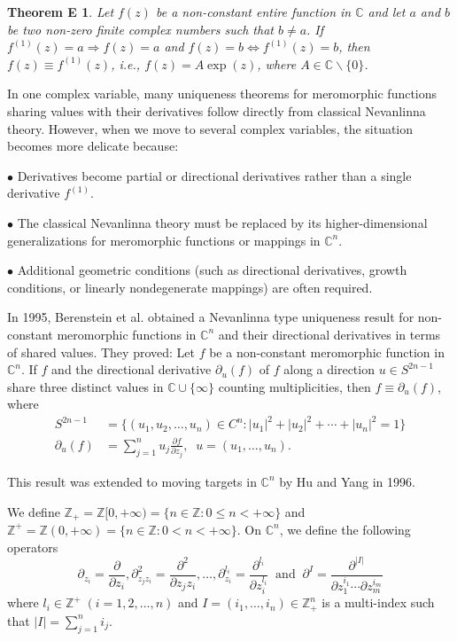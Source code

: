 \documentclass[11pt, reqno]{amsart}
\newtheorem*{theoE}{Theorem E}
\newtheorem*{cor A}{Corollary A}
\newtheorem*{cor B}{Corollary B}
\numberwithin{equation}{section}
\begin{document}
\begin{theoE}\cite[Theorem 1.1]{Lu-Xu-Yi-2009} Let $f(z)$ be a non-constant entire function in $\mathbb{C}$ and let $a$ and $b$ be two non-zero finite complex numbers such that $b\not=a$. If $f^{(1)}(z)=a\Rightarrow f(z)=a$  and $f(z)=b\Leftrightarrow f^{(1)}(z)=b$, then $f(z)\equiv f^{(1)}(z)$, i.e., $f(z)=A\exp(z)$, where $A\in\mathbb{C}\backslash \{0\}$.
\end{theoE}

In one complex variable, many uniqueness theorems for meromorphic functions sharing values with their derivatives follow directly from classical Nevanlinna theory. However, when we move to several complex variables, the situation becomes more delicate because:

$\bullet$ Derivatives become partial or directional derivatives rather than a single derivative $f^{(1)}$.

$\bullet$ The classical Nevanlinna theory must be replaced by its higher-dimensional generalizations for meromorphic functions or mappings in $\mathbb{C}^n$.

$\bullet$ Additional geometric conditions (such as directional derivatives, growth conditions, or linearly nondegenerate mappings) are often required.


\medskip
In 1995, Berenstein et al. \cite{Berenstein-Chang-Li-1995} obtained a Nevanlinna type uniqueness result for non-constant meromorphic functions in $\mathbb{C}^n$ and their directional derivatives in terms of shared values. They proved: Let $f$ be a non-constant meromorphic function in $\mathbb{C}^n$. If $f$ and the directional derivative $\partial_u(f)$ of $f$ along a direction $u\in S^{2n-1}$ share three distinct values in $\mathbb{C}\cup\{\infty\}$ counting multiplicities, then $f\equiv \partial_u(f)$, where 
\begin{align*}
 S^{2n-1}&=\{(u_1,u_2,\ldots,u_n)\in C^{n}: |u_1|^2+|u_2|^2+\cdots+|u_n|^2=1\}\\
\partial_u(f)&= \sum_{j=1}^{n} u_{j}\frac{\partial f}{\partial z_j},\;\; u=(u_1, \ldots ,u_n).
\end{align*}

This result was extended to moving targets in $\mathbb{C}^n$ by Hu and Yang \cite{Hu-Yang-1996} in 1996.

We define $\mathbb{Z}_+=\mathbb{Z}[0,+\infty)=\{n\in \mathbb{Z}: 0\leq n<+\infty\}$ and $\mathbb{Z}^+=\mathbb{Z}(0,+\infty)=\{n\in \mathbb{Z}: 0<n<+\infty\}$.
On $\mathbb{C}^n$, we define the following operators
\[\partial_{z_i}=\frac{\partial}{\partial z_i},\partial^2_{z_jz_i}=\frac{\partial^2}{\partial z_jz_i},\ldots, \partial_{z_i}^{l_i}=\frac{\partial^{l_i}}{\partial z_i^{l_i}}\;\;\text{and}\;\;\partial^{I}=\frac{\partial^{|I|}}{\partial z_1^{i_1}\cdots \partial z_m^{i_m}}\]
where $l_i\in \mathbb{Z}^+\;(i=1,2,\ldots,n)$ and $I=(i_1,\ldots,i_n)\in\mathbb{Z}^n_+$ is a multi-index such that $|I|=\sum_{j=1}^n i_j$.
\end{document}
